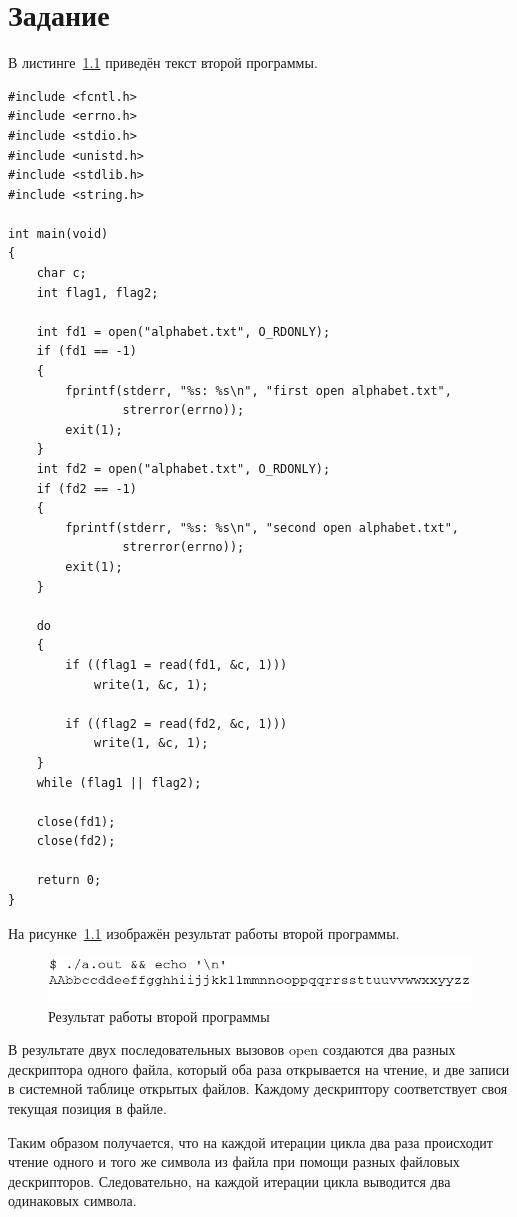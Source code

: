 \chapter{Задание }

В листинге~\ref{img:task02} приведён текст второй программы.

\begin{lstlisting}[label=img:task02,caption={Текст второй программы}]
#include <fcntl.h>
#include <errno.h>
#include <stdio.h>
#include <unistd.h>
#include <stdlib.h>
#include <string.h>

int main(void)
{
    char c;
    int flag1, flag2;

    int fd1 = open("alphabet.txt", O_RDONLY);
    if (fd1 == -1)
    {
        fprintf(stderr, "%s: %s\n", "first open alphabet.txt",
                strerror(errno));
        exit(1);
    }
    int fd2 = open("alphabet.txt", O_RDONLY);
    if (fd2 == -1)
    {
        fprintf(stderr, "%s: %s\n", "second open alphabet.txt",
                strerror(errno));
        exit(1);
    }

    do
    {
        if ((flag1 = read(fd1, &c, 1)))
            write(1, &c, 1);

        if ((flag2 = read(fd2, &c, 1)))
            write(1, &c, 1);
    }
    while (flag1 || flag2);

    close(fd1);
    close(fd2);

    return 0;
}
\end{lstlisting}

На рисунке~\ref{img:task02} изображён результат работы второй программы.

\begin{figure}[H]
    \includegraphics[scale=0.5]{images/task02.png}
    \caption{Результат работы второй программы}\label{img:task02}
\end{figure}

В результате двух последовательных вызовов open создаются два разных дескриптора одного файла, который оба раза открывается на чтение, и две записи в системной таблице открытых файлов. Каждому дескриптору соответствует своя текущая позиция в файле.

Таким образом получается, что на каждой итерации цикла два раза происходит чтение одного и того же символа из файла при помощи разных файловых дескрипторов. Следовательно, на каждой итерации цикла выводится два одинаковых символа.

